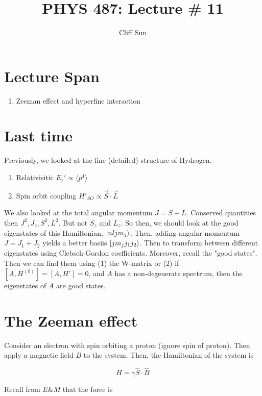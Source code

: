 \documentclass{article}
\title{PHYS 487: Lecture \# 11}
\author{Cliff Sun}
\newtheorem{one minute paper}[theorem]{One Minute Paper}
\begin{document}
\maketitle

\section*{Lecture Span}
\begin{enumerate}
    \item Zeeman effect and hyperfine interaction
\end{enumerate}

\section*{Last time}

Previously, we looked at the fine (detailed) structure of Hydrogen. 

\begin{enumerate}
    \item Relativisitic $E_r' \propto \langle p^4 \rangle$
    \item Spin orbit coupling $H'_{SO} \propto \vec{S} \cdot \vec{L}$
\end{enumerate}

We also looked at the total angular momentum $J = S + L$. Conserved quantities then $J^2, J_z, S^2, L^2$. But not $S_z$ and $L_z$. So then, 
we should look at the good eigenstates of this Hamiltonian, $\ket{nljm_j}$. Then, adding angular momentum $J = J_1 + J_2$ yields a better basiis $\ket{jm_j j_1j_2}$. Then to transform 
between different eigenstates using Clebsch-Gordon coefficients. Moreover, recall the "good states". Then we can find them using (1) the W-matrix or (2) if $[A,H^{(0)}] = [A,H'] = 0$, and $A$ has a non-degenerate spectrum, then the eigenstates of $A$ are good states. 

\section*{The Zeeman effect}

Consider an electron with spin orbiting a proton (ignore spin of proton). Then apply a magnetic field $B$ to the system. Then, the Hamiltonian of the system is 

\begin{equation}
    H = \gamma \hat{S} \cdot \hat{B}
\end{equation}

Recall from $E\&M$ that the force is 
\end{document}
